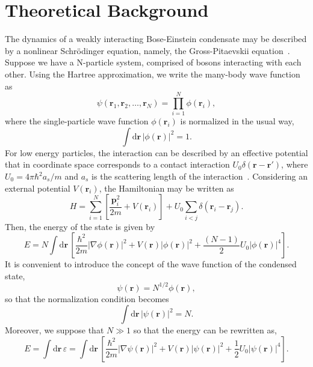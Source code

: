 \section{Theoretical Background}
The dynamics of a weakly interacting Bose-Einstein condensate may be described by a nonlinear Schr\"odinger equation, namely, the Gross-Pitaevskii equation~\citep{pethick2002bose,DGPS99,LSA12}. Suppose we have a N-particle system, comprised of bosons interacting with each other. Using the Hartree approximation, we write the many-body wave function as
\begin{equation}
\psi(\textbf{r}_1, \textbf{r}_2,\ldots, \textbf{r}_N) = \prod_{i=1}^N \phi(\textbf{r}_i),
\end{equation}
where the single-particle wave function $\phi(\textbf{r}_i)$ is normalized in the usual way,
\begin{equation}
\int \mathrm{d}\textbf{r} \, |\phi(\textbf{r})|^2 = 1.
\end{equation} 
For low energy particles, the interaction can be described by an effective potential
that in coordinate space corresponds to a contact interaction $U_0 \delta(\textbf{r} - \textbf{r}')$, where $U_0 = 4 \pi \hbar^2 a_s / m$ and $a_s$ is the scattering length of the interaction~\citep{pethick2002bose}. Considering an external potential $V(\textbf{r}_i)$, the Hamiltonian may be written as
\begin{equation}
H = \sum_{i=1}^N \left[ \frac{\textbf{p}_i^2}{2 m} + V(\textbf{r}_i) \right] + U_0 \sum_{i<j} \delta(\textbf{r}_i - \textbf{r}_j).
\end{equation}
Then, the energy of the state is given by
\begin{equation}
E =  N \int \mathrm{d} \textbf{r} \, \left[ \frac{\hbar^2}{2m} |\nabla \phi(\textbf{r}) |^2 + V(\textbf{r}) |\phi(\textbf{r})|^2 + \frac{(N-1)}{2} U_0 |\phi(\textbf{r})|^4 \right].
\end{equation} 
It is convenient to introduce the concept of the wave function of the condensed state,
\begin{equation}
\psi(\textbf{r}) = N^{1/2} \phi(\textbf{r}),
\end{equation}
so that the normalization condition becomes
\begin{equation} \label{eq:normalization-N}
\int \mathrm{d}\textbf{r} \, |\psi(\textbf{r})|^2 = N.
\end{equation}
Moreover, we suppose that $N \gg 1$ so that the energy can be rewritten as,
\begin{equation}
E = \int \mathrm{d} \textbf{r} \, \varepsilon  = \int \mathrm{d} \textbf{r} \, \left[ \frac{\hbar^2}{2m} |\nabla \psi(\textbf{r}) |^2 + V(\textbf{r}) |\psi(\textbf{r})|^2 + \frac{1}{2} U_0 |\psi(\textbf{r})|^4 \right].
\end{equation}
